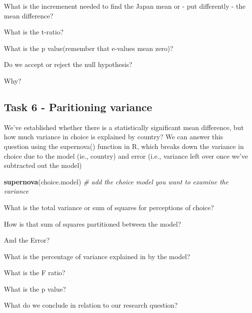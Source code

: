 \documentclass[
]{article}
\newenvironment{Shaded}{\begin{snugshade}}{\end{snugshade}}
\newcommand{\CommentTok}[1]{\textcolor[rgb]{0.56,0.35,0.01}{\textit{#1}}}
\newcommand{\FunctionTok}[1]{\textcolor[rgb]{0.13,0.29,0.53}{\textbf{#1}}}
\newcommand{\NormalTok}[1]{#1}
\begin{document}
What is the incremenent needed to find the Japan mean or - put
differently - the mean difference?

What is the t-ratio?

What is the p value(remember that e-values mean zero)?

Do we accept or reject the null hypothesis?

Why?

\subsection{Task 6 - Paritioning
variance}\label{task-6---paritioning-variance}

We've established whether there is a statistically significant mean
difference, but how much variance in choice is explained by country? We
can answer this question using the supernova() function in R, which
breaks down the variance in choice due to the model (ie., country) and
error (i.e., variance left over once we've subtracted out the model)

\begin{Shaded}
\begin{Highlighting}[]
\FunctionTok{supernova}\NormalTok{(choice.model) }\CommentTok{\# add the choice model you want to examine the variance}
\end{Highlighting}
\end{Shaded}

What is the total variance or sum of squares for perceptions of choice?

How is that sum of squares partitioned between the model?

And the Error?

What is the percentage of variance explained in by the model?

What is the F ratio?

What is the p value?

What do we conclude in relation to our research question?
\end{document}
